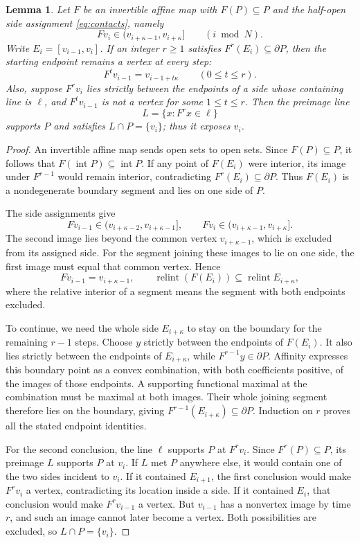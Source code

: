 \documentclass[11pt,a4paper]{article}
\DeclareMathOperator{\relint}{relint}
\newtheorem{lemma}[theorem]{Lemma}
\theoremstyle{definition}
\theoremstyle{remark}
\numberwithin{equation}{section}
\begin{document}
\begin{lemma}\label{lem:boundary-persistence}
Let $F$ be an invertible affine map with $F(P)\subseteq P$ and the half-open side assignment \eqref{eq:contacts}, namely
\[
 Fv_i\in(v_{i+\kappa-1},v_{i+\kappa}]
 \qquad(i\bmod N).
\]
Write $E_i=[v_{i-1},v_i]$. If an integer $r\ge1$ satisfies $F^r(E_i)\subseteq\partial P$, then the starting endpoint remains a vertex at every step:
\[
 F^t v_{i-1}=v_{i-1+t\kappa}\qquad(0\le t\le r).
\]
Also, suppose $F^rv_i$ lies strictly between the endpoints of a side whose containing line is $\ell$, and $F^tv_{i-1}$ is not a vertex for some $1\le t\le r$. Then the preimage line
\[
 L=\{x:F^rx\in\ell\}
\]
supports $P$ and satisfies $L\cap P=\{v_i\}$; thus it exposes $v_i$.
\end{lemma}
\begin{proof}
An invertible affine map sends open sets to open sets. Since $F(P)\subseteq P$, it follows that $F(\operatorname{int}P)\subseteq\operatorname{int}P$. If any point of $F(E_i)$ were interior, its image under $F^{r-1}$ would remain interior, contradicting $F^r(E_i)\subseteq\partial P$. Thus $F(E_i)$ is a nondegenerate boundary segment and lies on one side of $P$.

The side assignments give
\[
 Fv_{i-1}\in(v_{i+\kappa-2},v_{i+\kappa-1}],\qquad
 Fv_i\in(v_{i+\kappa-1},v_{i+\kappa}].
\]
The second image lies beyond the common vertex $v_{i+\kappa-1}$, which is excluded from its assigned side. For the segment joining these images to lie on one side, the first image must equal that common vertex. Hence
\[
 Fv_{i-1}=v_{i+\kappa-1},\qquad
 \relint(F(E_i))\subseteq\relint E_{i+\kappa},
\]
where the relative interior of a segment means the segment with both endpoints excluded.

To continue, we need the whole side $E_{i+\kappa}$ to stay on the boundary for the remaining $r-1$ steps. Choose $y$ strictly between the endpoints of $F(E_i)$. It also lies strictly between the endpoints of $E_{i+\kappa}$, while $F^{r-1}y\in\partial P$. Affinity expresses this boundary point as a convex combination, with both coefficients positive, of the images of those endpoints. A supporting functional maximal at the combination must be maximal at both images. Their whole joining segment therefore lies on the boundary, giving $F^{r-1}(E_{i+\kappa})\subseteq\partial P$. Induction on $r$ proves all the stated endpoint identities.

For the second conclusion, the line $\ell$ supports $P$ at $F^rv_i$. Since $F^r(P)\subseteq P$, its preimage $L$ supports $P$ at $v_i$. If $L$ met $P$ anywhere else, it would contain one of the two sides incident to $v_i$. If it contained $E_{i+1}$, the first conclusion would make $F^rv_i$ a vertex, contradicting its location inside a side. If it contained $E_i$, that conclusion would make $F^rv_{i-1}$ a vertex. But $v_{i-1}$ has a nonvertex image by time $r$, and such an image cannot later become a vertex. Both possibilities are excluded, so $L\cap P=\{v_i\}$.
\end{proof}
\end{document}
